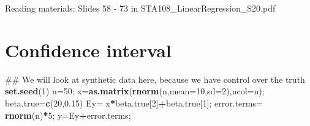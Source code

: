 \documentclass[12pt,]{book}
\newenvironment{Shaded}{\begin{snugshade}}{\end{snugshade}}
\newcommand{\KeywordTok}[1]{\textcolor[rgb]{0.13,0.29,0.53}{\textbf{#1}}}
\newcommand{\DataTypeTok}[1]{\textcolor[rgb]{0.13,0.29,0.53}{#1}}
\newcommand{\DecValTok}[1]{\textcolor[rgb]{0.00,0.00,0.81}{#1}}
\newcommand{\FloatTok}[1]{\textcolor[rgb]{0.00,0.00,0.81}{#1}}
\newcommand{\StringTok}[1]{\textcolor[rgb]{0.31,0.60,0.02}{#1}}
\newcommand{\CommentTok}[1]{\textcolor[rgb]{0.56,0.35,0.01}{\textit{#1}}}
\newcommand{\OperatorTok}[1]{\textcolor[rgb]{0.81,0.36,0.00}{\textbf{#1}}}
\newcommand{\NormalTok}[1]{#1}
\begin{document}
Reading materials: Slides 58 - 73 in STA108\_LinearRegression\_S20.pdf

\section{Confidence interval}\label{confidence-interval}

\begin{Shaded}
\begin{Highlighting}[]
\NormalTok{## We will look at synthetic data here, because we have control over the truth }
\KeywordTok{set.seed}\NormalTok{(}\DecValTok{1}\NormalTok{)}
\NormalTok{n=}\DecValTok{50}\NormalTok{;}
\NormalTok{x=}\KeywordTok{as.matrix}\NormalTok{(}\KeywordTok{rnorm}\NormalTok{(n,}\DataTypeTok{mean=}\DecValTok{10}\NormalTok{,}\DataTypeTok{sd=}\DecValTok{2}\NormalTok{),}\DataTypeTok{ncol=}\NormalTok{n);}
\NormalTok{beta.true=}\KeywordTok{c}\NormalTok{(}\DecValTok{20}\NormalTok{,}\FloatTok{0.15}\NormalTok{)}
\NormalTok{Ey=}\StringTok{ }\NormalTok{x}\OperatorTok{*}\NormalTok{beta.true[}\DecValTok{2}\NormalTok{]}\OperatorTok{+}\NormalTok{beta.true[}\DecValTok{1}\NormalTok{];}
\NormalTok{error.terms=}\StringTok{ }\KeywordTok{rnorm}\NormalTok{(n)}\OperatorTok{*}\DecValTok{5}\NormalTok{;}
\NormalTok{y=Ey}\OperatorTok{+}\NormalTok{error.terms;}
\end{Highlighting}
\end{Shaded}

\begin{Shaded}
\end{Shaded}
\end{document}
